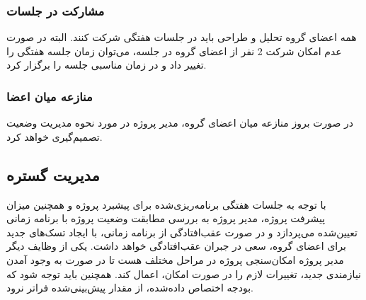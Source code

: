 \subsubsection{مشارکت در جلسات}
همه اعضای گروه تحلیل و طراحی باید در جلسات هفتگی شرکت کنند. البته در صورت عدم امکان شرکت 2 نفر از اعضای گروه در جلسه، می‌توان زمان جلسه هفتگی را تغییر داد و در زمان مناسبی جلسه را برگزار کرد.

\subsubsection{منازعه میان اعضا}
در صورت بروز منازعه میان اعضای گروه، مدیر پروژه در مورد نحوه مدیریت وضعیت تصمیم‌گیری خواهد کرد.

\subsection{مدیریت گستره}
با توجه به جلسات هفتگی برنامه‌ریزی‌شده برای پیشبرد پروژه و همچنین میزان پیشرفت پروژه، مدیر پروژه به بررسی مطابقت وضعیت پروژه با برنامه زمانی تعیین‌شده می‌پردازد و در صورت عقب‌افتادگی از برنامه زمانی، با ایجاد تسک‌های جدید برای اعضای گروه، سعی در جبران عقب‌افتادگی خواهد داشت. یکی از وظایف دیگر مدیر پروژه امکان‌سنجی پروژه در مراحل مختلف هست تا در صورت به وجود آمدن نیازمندی جدید، تغییرات لازم را در صورت امکان، اعمال کند. همچنین باید توجه شود که بودجه اختصاص داده‌شده، از مقدار پیش‌بینی‌شده فراتر نرود.
